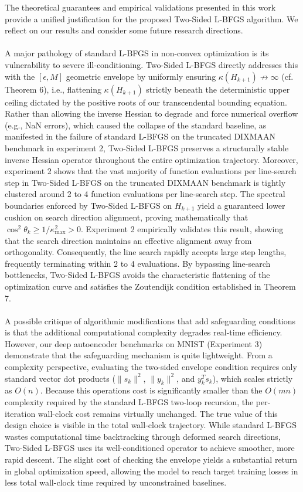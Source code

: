\documentclass[twoside,11pt]{article}
\begin{document}
The theoretical guarantees and empirical validations presented in this work provide a unified justification for the proposed Two-Sided L-BFGS algorithm. We reflect on our results and consider some future research directions. \\
\\
A major pathology of standard L-BFGS in non-convex optimization is its vulnerability to severe ill-conditioning. Two-Sided L-BFGS directly addresses this with the $[\epsilon, M]$ geometric envelope by uniformly ensuring $\kappa(H_{k+1}) \not\to \infty$ (cf. Theorem 6), i.e., flattening $\kappa(H_{k+1})$ strictly beneath the deterministic upper ceiling dictated by the positive roots of our transcendental bounding equation. Rather than allowing the inverse Hessian to degrade and force numerical overflow (e.g., NaN errors), which caused the collapse of the standard baseline, as manifested in the failure of standard L-BFGS on the truncated DIXMAAN benchmark in experiment 2, Two-Sided L-BFGS preserves a structurally stable inverse Hessian operator throughout the entire optimization trajectory. Moreover, experiment 2 shows that the vast majority of function evaluations per line-search step in Two-Sided L-BFGS on the truncated DIXMAAN benchmark is tightly clustered around 2 to 4 function evaluations per line-search step. The spectral boundaries enforced by Two-Sided L-BFGS on $H_{k+1}$ yield a guaranteed lower cushion on search direction alignment, proving mathematically that $\cos^2\theta_k \geq 1/\kappa_{\max}^2 > 0$. Experiment 2 empirically validates this result, showing that the search direction maintains an effective alignment away from orthogonality. Consequently, the line search rapidly accepts large step lengths, frequently terminating within 2 to 4 evaluations. By bypassing line-search bottlenecks, Two-Sided L-BFGS avoids the characteristic flattening of the optimization curve and satisfies the Zoutendijk condition established in Theorem 7. \\
\\
A possible critique of algorithmic modifications that add safeguarding conditions is that the additional computational complexity degrades real-time efficiency. However, our deep autoencoder benchmarks on MNIST (Experiment 3) demonstrate that the safeguarding mechanism is quite lightweight. From a complexity perspective, evaluating the two-sided envelope condition requires only standard vector dot products ($\|s_k\|^2$, $\|y_k\|^2$, and $y_k^T s_k$), which scales strictly as $O(n)$. Because this operations cost is significantly smaller than the $O(mn)$ complexity required by the standard L-BFGS two-loop recursion, the per-iteration wall-clock cost remains virtually unchanged. The true value of this design choice is visible in the total wall-clock trajectory. While standard L-BFGS wastes computational time backtracking through deformed search directions, Two-Sided L-BFGS uses its well-conditioned operator to achieve smoother, more rapid descent. The slight cost of checking the envelope yields a substantial return in global optimization speed, allowing the model to reach target training losses in less total wall-clock time required by unconstrained baselines. \\
\end{document}
